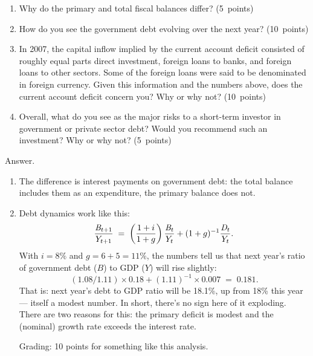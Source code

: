 \documentclass[letterpaper,12pt]{article}
\begin{document}
\begin{enumerate}
\begin{enumerate}
\item Why do the primary and total fiscal balances differ?  
(5~points)

\item How do you see the government debt evolving over the next year?  (10~points)

\item In 2007, the capital inflow implied by the current account deficit consisted of roughly  equal parts
    direct investment, foreign loans to banks, and foreign loans to 
    other sectors.  Some of the foreign loans were said to be 
    denominated in foreign currency.
    Given this information and the numbers above, 
    does the current account deficit concern you?  
    Why or why not?  
    (10~points)

\item Overall, what do you see as the major risks to a short-term investor in government or private sector debt?  
    Would you recommend such an investment?  Why or why not?  
    (5~points) 
\end{enumerate}

Answer.
\begin{enumerate}
\item The difference is interest payments on government debt:
the total balance includes them as an expenditure, 
the primary balance does not.  

\item Debt dynamics work like this:  
\[
    \frac{\mbox{\em B}_{t+1}}{Y_{t+1}} \;=\; 
            \left( \frac{1+i}{1+g} \right)
            \frac{\mbox{\em B}_{t}}{Y_{t}} + (1+g)^{-1} 
            \frac{\mbox{\em D}_{t}}{Y_{t}} .
\]
With $ i = 8\%$ and $ g = 6 + 5 = 11\%$, 
the numbers tell us that next year's ratio of government debt ($B$) 
to GDP ($Y$) will rise slightly:
\[
    (1.08/1.11) \times 0.18 + (1.11)^{-1} \times 0.007 \;=\; 0.181 .
\]
That is:  next year's debt to GDP ratio will be 18.1\%, 
up from 18\% this year --- itself a modest number.
In short, there's no sign here of it exploding.  
There are two reasons for this:  the primary deficit is modest
and the (nominal) growth rate exceeds the interest rate.  


Grading:  10 points for something like this analysis.  


\end{enumerate}
\end{enumerate}
\end{document}
